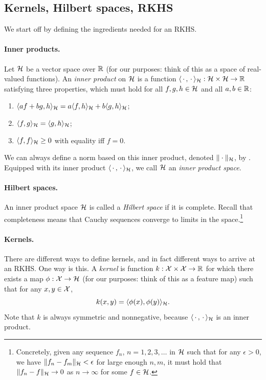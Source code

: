 \documentclass{article}
\begin{document}
\subsection{Kernels, Hilbert spaces, RKHS}

We start off by defining the ingredients needed for an RKHS. 

\paragraph{Inner products.}

Let $\mathcal{H}$ be a vector space over $\mathbb{R}$ (for our purposes: think of this as a
space of real-valued functions). An \emph{inner product} on $\mathcal{H}$ is a function
$\langle \,\cdot\,, \,\cdot\, \rangle_{\mathcal{H}} : \mathcal{H} \times \mathcal{H} \to \mathbb{R}$ satisfying
three properties, which must hold for all $f,g,h \in \mathcal{H}$ and all $a,b \in \mathbb{R}$: 
\begin{enumerate}
\item $\langle af + bg, h \rangle_{\mathcal{H}} = a \langle f,h \rangle_{\mathcal{H}} + b \langle
  g,h \rangle_{\mathcal{H}}$;
\item $\langle f,g \rangle_{\mathcal{H}} = \langle g,h \rangle_{\mathcal{H}}$;
\item $\langle f,f \rangle_{\mathcal{H}} \geq 0$ with equality iff $f=0$. 
\end{enumerate}
We can always define a norm based on this inner product, denoted
$\|\cdot\|_{\mathcal{H}}$, by . Equipped
with its inner product $\langle \,\cdot\,, \,\cdot\, \rangle_{\mathcal{H}}$, we call $\mathcal{H}$
an \emph{inner product space}. 

\paragraph{Hilbert spaces.} 

An inner product space $\mathcal{H}$ is called a \emph{Hilbert space} if it is
complete. Recall that completeness means that Cauchy sequences converge to  
limits in the space.\footnote{Concretely, given any sequence $f_n$,
  $n=1,2,3,\ldots$ in $\mathcal{H}$ such that for any $\epsilon>0$, we have $\|f_n - 
  f_m\|_{\mathcal{H}} < \epsilon$ for large enough $n,m$, it must hold that $\|f_n - 
  f\|_{\mathcal{H}} \to 0$ as $n \to \infty$ for some $f \in \mathcal{H}$.}

\paragraph{Kernels.}

There are different ways to define kernels, and in fact different ways to arrive 
at an RKHS. One way is this. A \emph{kernel} is function $k : \mathcal{X} \times \mathcal{X} \to 
\mathbb{R}$ for which there exists a map $\phi : \mathcal{X} \to \mathcal{H}$ (for our purposes: think
of this as a feature map) such that for any $x,y \in \mathcal{X}$,  
\[
k(x,y) = \langle \phi(x), \phi(y) \rangle_{\mathcal{H}}.
\]
Note that $k$ is always symmetric and nonnegative, because $\langle \,\cdot\,, 
\,\cdot\, \rangle_{\mathcal{H}}$ is an inner product. 
\end{document}
